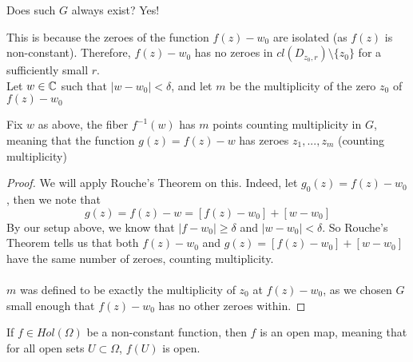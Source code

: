 \documentclass{article}
\begin{document}
Does such $G$ always exist? Yes!

This is because the zeroes of the function $f(z) - w_0$ are isolated (as $f(z)$ is non-constant). Therefore, $f(z) - w_0$ has no zeroes in $cl(D_{z_0, r}) \setminus \{z_0\}$ for a sufficiently small $r$.\\

Let $w \in \mathbb{C}$ such that $|w - w_0| < \delta$, and let $m$ be the multiplicity of the zero $z_0$ of $f(z) - w_0$

\begin{lemma}
Fix $w$ as above, the fiber $f^{-1}(w)$ has $m$ points counting multiplicity in $G$, meaning that the function $g(z) = f(z) - w$ has zeroes $z_1, ..., z_m$ (counting multiplicity)
\end{lemma}

\begin{proof}
We will apply Rouche's Theorem on this. Indeed, let $g_0(z) = f(z) - w_0$, then we note that
\[g(z) = f(z) - w = [f(z) - w_0] + [w - w_0]\]
By our setup above, we know that $|f - w_0| \geq \delta$ and $|w - w_0| < \delta$. So Rouche's Theorem tells us that both $f(z) - w_0$ and $g(z) = [f(z) - w_0] + [w - w_0]$ have the same number of zeroes, counting multiplicity.\\\\
$m$ was defined to be exactly the multiplicity of $z_0$ at $f(z) - w_0$, as we chosen $G$ small enough that $f(z) - w_0$ has no other zeroes within. 
\end{proof}

\begin{corollary}
If $f \in Hol(\Omega)$ be a non-constant function, then $f$ is an open map, meaning that for all open sets $U \subset \Omega$, $f(U)$ is open.
\end{corollary}
\end{document}
